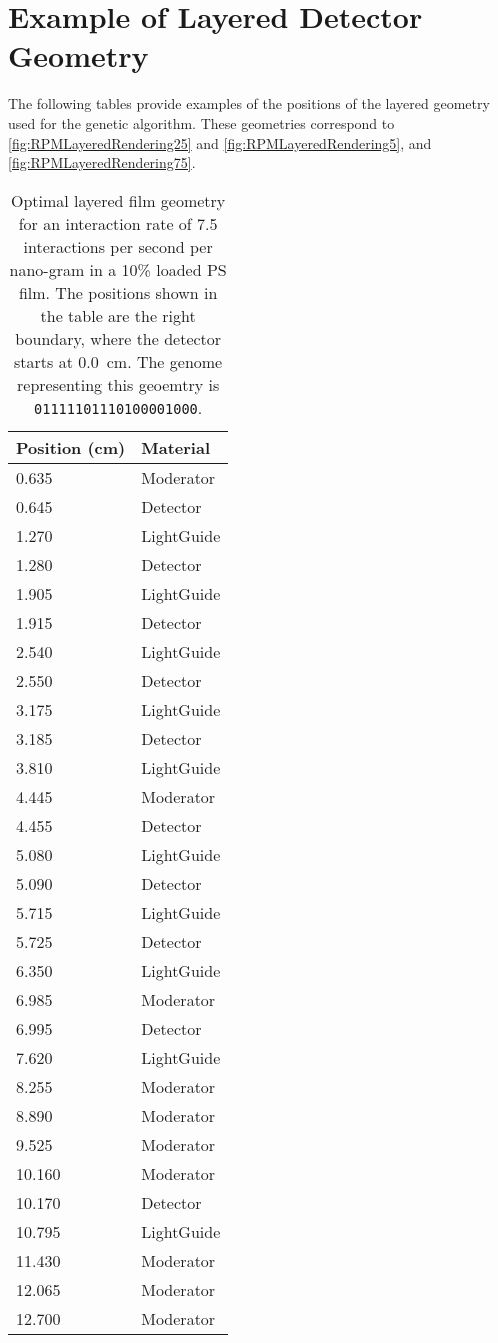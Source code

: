 \section{Example of Layered Detector Geometry}
The following tables provide examples of the positions of the layered geometry used for the genetic algorithm. 
These geometries correspond to \autoref{fig:RPMLayeredRendering25} and \autoref{fig:RPMLayeredRendering5}, and \autoref{fig:RPMLayeredRendering75}.
\begin{table}
	\caption[Optimal Layered Film Geometry for 7.5 interaction per second per nanogram Cf-252]{Optimal layered film geometry for an interaction rate of 7.5 interactions per second per nano-gram  in a 10\%  loaded PS film. The positions shown in the table are the right boundary, where the detector starts at \SI{0.0}{\cm}. The genome representing this geoemtry is \texttt{01111101110100001000}.}
	\label{tab:OptGeoDetailed75}
	\begin{tabular}{m{3cm} m{4cm}}
	\toprule
	Position (\si{\cm}) & Material \\
	\midrule
0.635&Moderator\\
0.645&Detector\\
1.270&LightGuide\\
1.280&Detector\\
1.905&LightGuide\\
1.915&Detector\\
2.540&LightGuide\\
2.550&Detector\\
3.175&LightGuide\\
3.185&Detector\\
3.810&LightGuide\\
4.445&Moderator\\
4.455&Detector\\
5.080&LightGuide\\
5.090&Detector\\
5.715&LightGuide\\
5.725&Detector\\
6.350&LightGuide\\
6.985&Moderator\\
6.995&Detector\\
7.620&LightGuide\\
8.255&Moderator\\
8.890&Moderator\\
9.525&Moderator\\
10.160&Moderator\\
10.170&Detector\\
10.795&LightGuide\\
11.430&Moderator\\
12.065&Moderator\\
12.700&Moderator\\
	\bottomrule
	\end{tabular}
\end{table}
